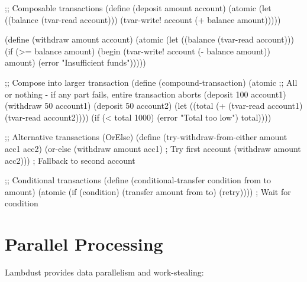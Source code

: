 \begin{example}
\begin{lambdustcode}
;; Composable transactions
(define (deposit amount account)
  (atomic 
    (let ((balance (tvar-read account)))
      (tvar-write! account (+ balance amount)))))

(define (withdraw amount account)
  (atomic
    (let ((balance (tvar-read account)))
      (if (>= balance amount)
          (begin 
            (tvar-write! account (- balance amount))
            amount)
          (error "Insufficient funds")))))

;; Compose into larger transaction
(define (compound-transaction)
  (atomic
    ;; All or nothing - if any part fails, entire transaction aborts
    (deposit 100 account1)
    (withdraw 50 account1)  
    (deposit 50 account2)
    (let ((total (+ (tvar-read account1) (tvar-read account2))))
      (if (< total 1000)
          (error "Total too low")
          total))))

;; Alternative transactions (OrElse)  
(define (try-withdraw-from-either amount acc1 acc2)
  (or-else 
    (withdraw amount acc1)     ; Try first account
    (withdraw amount acc2)))   ; Fallback to second account

;; Conditional transactions
(define (conditional-transfer condition from to amount)
  (atomic
    (if (condition)
        (transfer amount from to)
        (retry))))    ; Wait for condition
\end{lambdustcode}
\end{example}

\section{Parallel Processing}
\label{sec:parallel}


Lambdust provides data parallelism and work-stealing:

